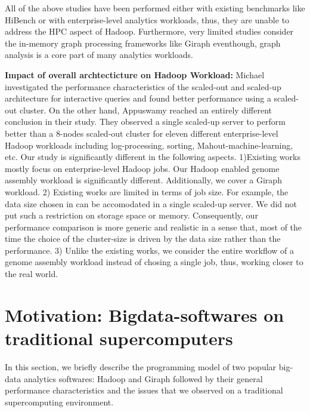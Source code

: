 \documentclass[conference]{IEEEtran}
\begin{document}
All of the above studies have been performed either with existing benchmarks like HiBench \cite{bm:hibench} or with enterprise-level analytics workloads, thus, they are unable to address the HPC aspect of Hadoop.
Furthermore, very limited studies consider the in-memory graph processing frameworks like Giraph eventhough, graph analysis is a core part of many analytics workloads.

\textbf{Impact of overall archtecticture on Hadoop Workload:}
Michael \cite{scaleupscaleout:michael} investigated the performance characteristics of the scaled-out and scaled-up architecture for interactive queries and found better performance using a scaled-out cluster.
On the other hand, Appuswamy \cite{scaleupscaleout:appuswamy} reached an entirely different conclusion in their study. 
They observed a single scaled-up server to perform better than a 8-nodes scaled-out cluster for eleven different enterprise-level Hadoop workloads including log-processing, sorting, Mahout-machine-learning, etc.
Our study is significantly different in the following aspects.
1)Existing works mostly focus on enterprise-level Hadoop jobs. Our Hadoop enabled genome assembly workload is significantly different. Additionally, we cover a Giraph workload. 
2) Existing works are limited in terms of job size. For example, the data size chosen in \cite{scaleupscaleout:appuswamy} can be accomodated in a single scaled-up server. We did not put such a restriction on storage space or memory. Consequently, our performance comparison is more generic and realistic in a sense that, most of the time the choice of the cluster-size is driven by the data size rather than the performance.
3) Unlike the existing works, we consider the entire workflow of a genome assembly workload instead of chosing a single job, thus, working closer to the real world.



\section {Motivation: Bigdata-softwares on traditional supercomputers} \label{Bigdata Softwares on Traditional Supercomputers}
In this section, we briefly describe the programming model of two popular big-data analytics softwares: Hadoop and Giraph followed by their general performance characteristics and the issues that we observed on a traditional supercomputing environment. 
\end{document}

